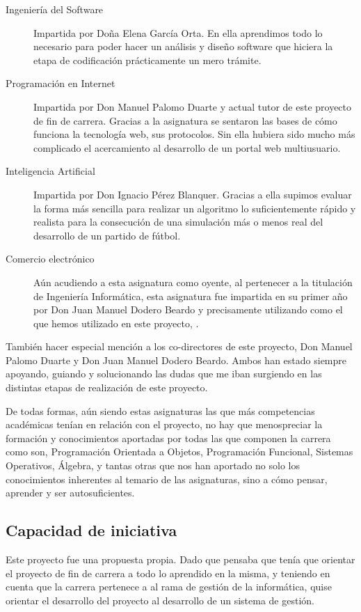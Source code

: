 \begin{description}
\item [Ingeniería del Software] Impartida por Doña Elena García Orta. En ella
  aprendimos todo lo necesario para poder hacer un análisis y diseño software
  que hiciera la etapa de codificación prácticamente un mero trámite.
\item [Programación en Internet] Impartida por Don Manuel Palomo Duarte y actual
  tutor de este proyecto de fin de carrera. Gracias a la asignatura se sentaron
  las bases de cómo funciona la tecnología web, sus protocolos. Sin ella hubiera
  sido mucho más complicado el acercamiento al desarrollo de un portal web
  multiusuario.
\item [Inteligencia Artificial] Impartida por Don Ignacio Pérez
  Blanquer. Gracias a ella supimos evaluar la forma más sencilla para realizar
  un algoritmo lo suficientemente rápido y realista para la consecución de una
  simulación más o menos real del desarrollo de un partido de fútbol.
\item [Comercio electrónico] Aún acudiendo a esta asignatura como oyente, al
  pertenecer a la titulación de Ingeniería Informática, esta asignatura fue
  impartida en su primer año por Don Juan Manuel Dodero Beardo y precisamente
  utilizando como  el que hemos utilizado en este proyecto,
  .
\end{description}

También hacer especial mención a los co-directores de este proyecto, Don Manuel
Palomo Duarte y Don Juan Manuel Dodero Beardo. Ambos han estado siempre
apoyando, guiando y solucionando las dudas que me iban surgiendo en las
distintas etapas de realización de este proyecto.

De todas formas, aún siendo estas asignaturas las que más competencias
académicas tenían en relación con el proyecto, no hay que menospreciar la
formación y conocimientos aportadas por todas las que componen la carrera como
son, Programación Orientada a Objetos, Programación Funcional, Sistemas
Operativos, Álgebra, y tantas otras que nos han aportado no solo los
conocimientos inherentes al temario de las asignaturas, sino a cómo pensar,
aprender y ser autosuficientes.

\subsection{Capacidad de iniciativa}
Este proyecto fue una propuesta propia. Dado que pensaba que tenía que orientar
el proyecto de fin de carrera a todo lo aprendido en la misma, y teniendo en
cuenta que la carrera pertenece a al rama de gestión de la informática, quise
orientar el desarrollo del proyecto al desarrollo de un sistema de gestión.

